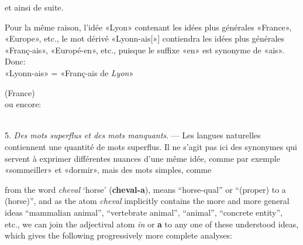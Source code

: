 \begin{sloppypar}
{{    \noindent
    et ainsi de suite.

    Pour la même raison, l’idée «Lyon» contenant les idées plus
    générales «France», «Europe», etc., le mot dérivé «Lyonn-ais[»]
    contiendra les idées plus générales «Franç-ais», «Europé-en», etc.,
    puisque le suffixe «en» est synonyme de «ais». Donc:\\[1ex]

    «Lyonn-ais» = «Franç-ais de \emph{Lyon}»

    {\footnotesize (France)}\\[1ex]

    \noindent
    ou encore:

    \noindent
    \\[1ex]
    
    5. \emph{Des mots superflus et des mots manquants}. — Les langues
    naturelles contiennent une quantité de mots superflus. Il ne
    s'agit pas ici des synonymes qui servent à exprimer différentes
    nuances d'une même idée, comme par exemple «sommeiller» et
    «dormir», mais des mots simples, comme} }
%
{\noindent
  {\small from the word \emph{cheval} `horse' (\textbf{cheval-a}), means
    ``horse-qual'' or ``(proper) to a (horse)'', and as the atom
    \emph{cheval} implicitly contains the more and more general ideas
    ``mammalian animal'', ``vertebrate animal'', ``animal'',
    ``concrete entity'', etc., we can join the adjectival atom \emph{in}
    or \textbf{a} to any one of these understood ideas, which gives
    the following progressively more complete analyses:\\[1ex]

    \noindent
    \\[1ex]

}}
\end{sloppypar}
